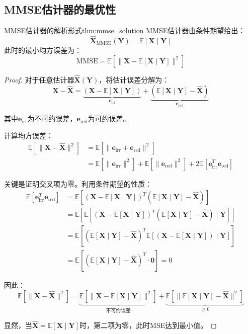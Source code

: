 \documentclass[11pt]{article}
\renewcommand{\vec}[1]{\bm{#1}}
\newcommand{\E}{\mathbb{E}}
\begin{document}
\subsection{MMSE估计器的最优性}

\begin{theorem}{MMSE估计器的解析形式}{thm:mmse_solution}
MMSE估计器由条件期望给出：
\begin{equation}
\hat{\vec{X}}_{\text{MMSE}}(\vec{Y}) = \E[\vec{X} \mid \vec{Y}]
\end{equation}
此时的最小均方误差为：
\begin{equation}
\text{MMSE} = \E\left[ \|\vec{X} - \E[\vec{X} \mid \vec{Y}]\|^2 \right]
\end{equation}
\end{theorem}

\begin{proof}
对于任意估计器$\hat{\vec{X}}(\vec{Y})$，将估计误差分解为：
\begin{equation}
\vec{X} - \hat{\vec{X}} = \underbrace{(\vec{X} - \E[\vec{X} \mid \vec{Y}])}_{\vec{e}_{\text{irr}}} + \underbrace{(\E[\vec{X} \mid \vec{Y}] - \hat{\vec{X}})}_{\vec{e}_{\text{red}}}
\end{equation}

其中$\vec{e}_{\text{irr}}$为不可约误差，$\vec{e}_{\text{red}}$为可约误差。

计算均方误差：
\begin{align}
\E[\|\vec{X} - \hat{\vec{X}}\|^2] &= \E[\|\vec{e}_{\text{irr}} + \vec{e}_{\text{red}}\|^2] \\
&= \E[\|\vec{e}_{\text{irr}}\|^2] + \E[\|\vec{e}_{\text{red}}\|^2] + 2\E[\vec{e}_{\text{irr}}^T \vec{e}_{\text{red}}]
\end{align}

关键是证明交叉项为零。利用条件期望的性质：
\begin{align}
\E[\vec{e}_{\text{irr}}^T \vec{e}_{\text{red}}] &= \E\left[ (\vec{X} - \E[\vec{X} \mid \vec{Y}])^T (\E[\vec{X} \mid \vec{Y}] - \hat{\vec{X}}) \right] \\
&= \E\left[ \E[(\vec{X} - \E[\vec{X} \mid \vec{Y}])^T (\E[\vec{X} \mid \vec{Y}] - \hat{\vec{X}}) \mid \vec{Y}] \right] \\
&= \E\left[ (\E[\vec{X} \mid \vec{Y}] - \hat{\vec{X}})^T \E[(\vec{X} - \E[\vec{X} \mid \vec{Y}]) \mid \vec{Y}] \right] \\
&= \E\left[ (\E[\vec{X} \mid \vec{Y}] - \hat{\vec{X}})^T \cdot \vec{0} \right] = 0
\end{align}

因此：
\begin{equation}
\E[\|\vec{X} - \hat{\vec{X}}\|^2] = \underbrace{\E[\|\vec{X} - \E[\vec{X} \mid \vec{Y}]\|^2]}_{\text{不可约误差}} + \underbrace{\E[\|\E[\vec{X} \mid \vec{Y}] - \hat{\vec{X}}\|^2]}_{\geq 0}
\end{equation}

显然，当$\hat{\vec{X}} = \E[\vec{X} \mid \vec{Y}]$时，第二项为零，此时MSE达到最小值。
\end{proof}
\end{document}
